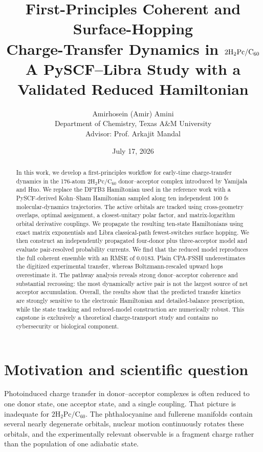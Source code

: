 \documentclass[11pt]{article}
\title{\vspace{-1.4em}\textbf{First-Principles Coherent and Surface-Hopping\\Charge-Transfer Dynamics in $2\HtwoPc/\Csixty$}\\[0.35em]
\large A PySCF--Libra Study with a Validated Reduced Hamiltonian}
\author{Amirhosein (Amir) Amini\\
Department of Chemistry, Texas A\&M University\\
Advisor: Prof. Arkajit Mandal}
\date{July 17, 2026}
\newcommand{\Csixty}{\mathrm{C}_{60}}
\newcommand{\HtwoPc}{\mathrm{H_2Pc}}
\begin{document}
\maketitle
\vspace{-1.15em}

\begin{abstract}
In this work, we develop a first-principles workflow for early-time charge-transfer dynamics in the 176-atom $2\HtwoPc/\Csixty$ donor--acceptor complex introduced by Yamijala and Huo. We replace the DFTB3 Hamiltonian used in the reference work with a PySCF-derived Kohn--Sham Hamiltonian sampled along ten independent 100 fs molecular-dynamics trajectories. The active orbitals are tracked using cross-geometry overlaps, optimal assignment, a closest-unitary polar factor, and matrix-logarithm orbital derivative couplings. We propagate the resulting ten-state Hamiltonians using exact matrix exponentials and Libra classical-path fewest-switches surface hopping. We then construct an independently propagated four-donor plus three-acceptor model and evaluate pair-resolved probability currents. We find that the reduced model reproduces the full coherent ensemble with an RMSE of 0.0183. Plain CPA-FSSH underestimates the digitized experimental transfer, whereas Boltzmann-rescaled upward hops overestimate it. The pathway analysis reveals strong donor--acceptor coherence and substantial recrossing: the most dynamically active pair is not the largest source of net acceptor accumulation. Overall, the results show that the predicted transfer kinetics are strongly sensitive to the electronic Hamiltonian and detailed-balance prescription, while the state tracking and reduced-model construction are numerically robust. This capstone is exclusively a theoretical charge-transport study and contains no cybersecurity or biological component.
\end{abstract}

\section{Motivation and scientific question}
Photoinduced charge transfer in donor--acceptor complexes is often reduced to one donor state, one acceptor state, and a single coupling. That picture is inadequate for $2\HtwoPc/\Csixty$. The phthalocyanine and fullerene manifolds contain several nearly degenerate orbitals, nuclear motion continuously rotates these orbitals, and the experimentally relevant observable is a fragment charge rather than the population of one adiabatic state.
\end{document}
